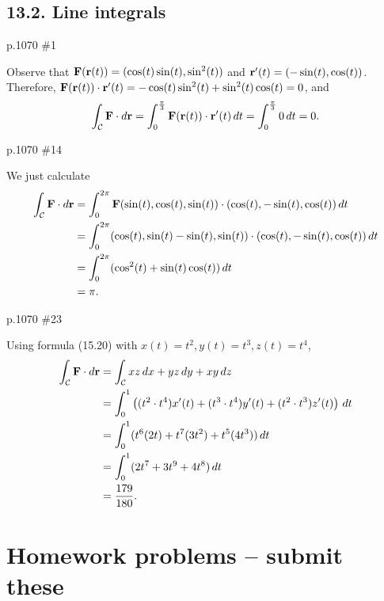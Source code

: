 \subsection{13.2. Line integrals}
\begin{practice}p.1070 \#1\end{practice}
\begin{pracsol}
  Observe that $\mathbf F(\mathbf r(t))=(\cos(t)\sin(t),\sin^2(t))$ and $\mathbf r'(t)=(-\sin(t),\cos(t))$. Therefore, $\mathbf F(\mathbf r(t))\cdot\mathbf r'(t)=-\cos(t)\sin^2(t)+\sin^2(t)\cos(t)=0$, and
  \[\int_{\mathcal C}\mathbf F\cdot d\mathbf r=\int_0^{\frac{\pi}{3}}\mathbf F(\mathbf r(t))\cdot\mathbf r'(t)\,dt=\int_0^{\frac\pi3}0\,dt=0.\]
\end{pracsol}
\begin{practice}p.1070 \#14\end{practice}
\begin{pracsol}
  We just calculate
  \[\begin{split}
    \int_{\mathcal C}\mathbf F\cdot d\mathbf r &= \int_0^{2\pi}\mathbf F(\sin(t),\cos(t),\sin(t))\cdot (\cos(t),-\sin(t),\cos(t))\,dt\\
    &= \int_0^{2\pi}(\cos(t),\sin(t)-\sin(t),\sin(t))\cdot (\cos(t),-\sin(t),\cos(t))\,dt\\
    &= \int_0^{2\pi}(\cos^2(t)+\sin(t)\cos(t))\,dt\\
    &=\pi.
  \end{split}\]
\end{pracsol}
\begin{practice}p.1070 \#23\end{practice}
\begin{pracsol}
  Using formula (15.20) with $x(t)=t^2,y(t)=t^3,z(t)=t^4$,
  \[\begin{split}
    \int_{\mathcal C}\mathbf F\cdot d\mathbf r &= \int_{\mathcal C}xz\,dx+yz\,dy+xy\,dz\\
    &= \int_0^1\left((t^2\cdot t^4)x'(t)+(t^3\cdot t^4)y'(t)+(t^2\cdot t^3)z'(t)\right)\,dt\\
    &= \int_0^1 (t^6(2t)+t^7(3t^2)+t^5(4t^3))\,dt\\
    &= \int_0^1 (2t^7+3t^9+4t^8)\,dt\\
    &= \frac{179}{180}.
  \end{split}\]
\end{pracsol}

\newpage

\section{Homework problems -- submit these}

